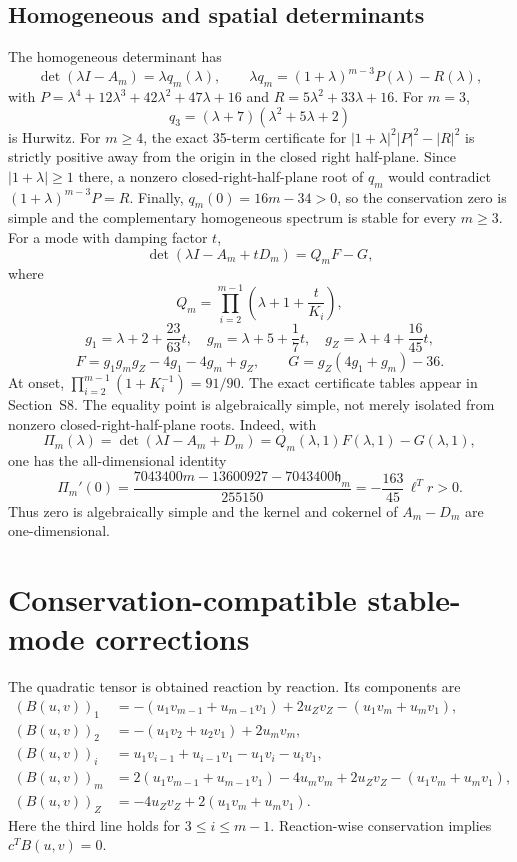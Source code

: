 \documentclass[10pt]{article}
\newcommand{\1}{\mathbf1}
\begin{document}
\subsection*{Homogeneous and spatial determinants}
The homogeneous determinant has
\[
 \det(\lambda I-A_m)=\lambda q_m(\lambda),
 \qquad
 \lambda q_m=(1+\lambda)^{m-3}P(\lambda)-R(\lambda),
\]
with
$P=\lambda^4+12\lambda^3+42\lambda^2+47\lambda+16$ and
$R=5\lambda^2+33\lambda+16$.
For $m=3$,
\[
 q_3=(\lambda+7)(\lambda^2+5\lambda+2)
\]
is Hurwitz.  For $m\ge4$, the exact 35-term certificate for
$|1+\lambda|^2|P|^2-|R|^2$ is strictly positive away from the origin in the
closed right half-plane.  Since $|1+\lambda|\ge1$ there, a nonzero
closed-right-half-plane root of $q_m$ would contradict
$(1+\lambda)^{m-3}P=R$.  Finally, $q_m(0)=16m-34>0$, so the conservation zero
is simple and the complementary homogeneous spectrum is stable for every
$m\ge3$.
For a mode with damping factor $t$,
\[
 \det(\lambda I-A_m+tD_m)=Q_mF-G,
\]
where
\[
 Q_m=\prod_{i=2}^{m-1}\left(\lambda+1+\frac{t}{K_i}\right),
\]
\[
 g_1=\lambda+2+\frac{23}{63}t,\quad
 g_m=\lambda+5+\frac17t,\quad
 g_Z=\lambda+4+\frac{16}{45}t,
\]
\[
 F=g_1g_mg_Z-4g_1-4g_m+g_Z,\qquad
 G=g_Z(4g_1+g_m)-36.
\]
At onset, $\prod_{i=2}^{m-1}(1+K_i^{-1})=91/90$.  The exact certificate
tables appear in Section~S8.  The equality point is algebraically simple,
not merely isolated from nonzero closed-right-half-plane roots.  Indeed, with
\[
 \Pi_m(\lambda)=\det(\lambda I-A_m+D_m)=Q_m(\lambda,1)F(\lambda,1)-G(\lambda,1),
\]
one has the all-dimensional identity
\[
 \Pi_m'(0)=
 \frac{7043400m-13600927-7043400\mathfrak h_m}{255150}
 =-\frac{163}{45}\,\ell^Tr>0.
\]
Thus zero is algebraically simple and the kernel and cokernel of $A_m-D_m$
are one-dimensional.

\section{Conservation-compatible stable-mode corrections}

The quadratic tensor is obtained reaction by reaction.  Its components are
\begin{align*}
(B(u,v))_1&=-(u_1v_{m-1}+u_{m-1}v_1)+2u_Zv_Z-(u_1v_m+u_mv_1),\\
(B(u,v))_2&=-(u_1v_2+u_2v_1)+2u_mv_m,\\
(B(u,v))_i&=u_1v_{i-1}+u_{i-1}v_1-u_1v_i-u_iv_1,\\
(B(u,v))_m&=2(u_1v_{m-1}+u_{m-1}v_1)-4u_mv_m+2u_Zv_Z
 -(u_1v_m+u_mv_1),\\
(B(u,v))_Z&=-4u_Zv_Z+2(u_1v_m+u_mv_1).
\end{align*}
Here the third line holds for $3\le i\le m-1$.  Reaction-wise conservation
implies $c^TB(u,v)=0$.
\end{document}
